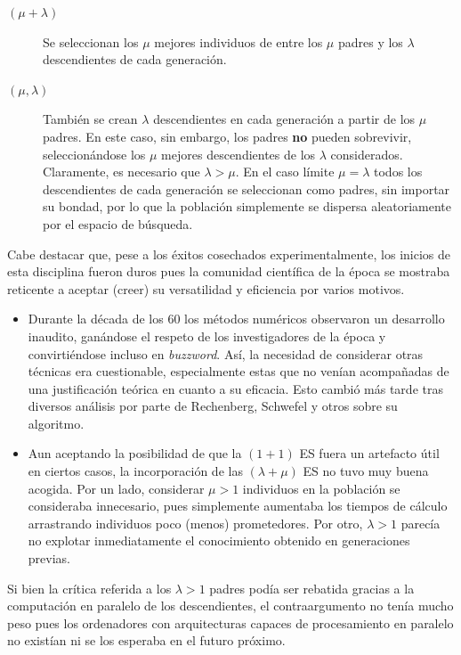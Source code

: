 \documentclass[12pt]{article} \usepackage[utf8x]{inputenc}
\begin{document}
\begin{description}
\item[$(\mu + \lambda)$] Se seleccionan los $\mu$
mejores individuos de entre los $\mu$ padres y los $\lambda$
descendientes de cada generación.
\item[$(\mu, \lambda)$] También se crean $\lambda$ descendientes en
  cada generación a partir de los $\mu$ padres. En este caso, sin
  embargo, los padres \textbf{no} pueden sobrevivir, seleccionándose
  los $\mu$ mejores descendientes de los $\lambda$
  considerados. Claramente, es necesario que $\lambda > \mu$. En el
  caso límite $\mu = \lambda$ todos los descendientes de cada
  generación se seleccionan como padres, sin importar su bondad, por
  lo que la población simplemente se dispersa aleatoriamente por el
  espacio de búsqueda.
\end{description}

Cabe destacar que, pese a los éxitos cosechados experimentalmente, los
inicios de esta disciplina fueron duros pues la comunidad científica
de la época se mostraba reticente a aceptar (creer) su versatilidad y
eficiencia por varios motivos.

\begin{itemize}
\item Durante la década de los 60 los métodos numéricos observaron un
  desarrollo inaudito, ganándose el respeto de los investigadores de
  la época y convirtiéndose incluso en \textit{buzzword}. Así, la
  necesidad de considerar otras técnicas era cuestionable,
  especialmente estas que no venían acompañadas de una justificación
  teórica en cuanto a su eficacia. Esto cambió más tarde tras diversos
  análisis por parte de Rechenberg, Schwefel y otros sobre su
  algoritmo.
\item Aun aceptando la posibilidad de que la $(1 + 1)$ ES fuera un
  artefacto útil en ciertos casos, la incorporación de las $(\lambda +
  \mu)$ ES no tuvo muy buena acogida. Por un lado, considerar $\mu >
  1$ individuos en la población se consideraba innecesario, pues
  simplemente aumentaba los tiempos de cálculo arrastrando individuos
  poco (menos) prometedores. Por otro, $\lambda > 1$ parecía no
  explotar inmediatamente el conocimiento obtenido en generaciones previas.
\end{itemize}

Si bien la crítica referida a los $\lambda > 1$ padres podía ser
rebatida gracias a la computación en paralelo de los descendientes, el
contraargumento no tenía mucho peso pues los ordenadores con
arquitecturas capaces de procesamiento en paralelo no existían ni se
los esperaba en el futuro próximo. \\
\end{document}
